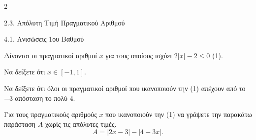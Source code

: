 \begin{ylh}{2}
    \item 2.3. Απόλυτη Τιμή Πραγματικού Αριθμού
    \item 4.1. Ανισώσεις 1ου Βαθμού
\end{ylh}
Δίνονται οι πραγματικοί αριθμοί $x$ για τους οποίους ισχύει $2|x| - 2 \le 0$ (1).

\begin{alist}
\item Να δείξετε ότι $x \in [-1, 1]$. 
\item Να δείξετε ότι όλοι οι πραγματικοί αριθμοί που ικανοποιούν την (1) απέχουν από το $-3$ απόσταση το πολύ $4$.
\item Για τους πραγματικούς αριθμούς $x$ που ικανοποιούν την (1) να γράψετε την παρακάτω παράσταση $A$ χωρίς τις απόλυτες τιμές.
\[A = |2x - 3| - |4 - 3x|.\] 
\end{alist}

